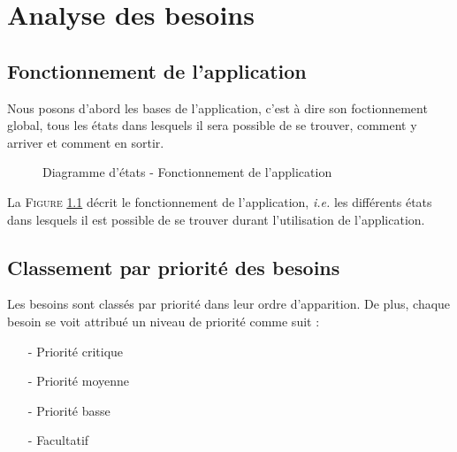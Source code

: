 \chapter{Analyse des besoins}

\section{Fonctionnement de l'application}

Nous posons d'abord les bases de l'application, c'est à dire son foctionnement global, tous les états dans lesquels il sera possible de se trouver, comment y arriver et comment en sortir.

 \begin{figure}[!ht]
 \begin{center}
  \caption{Diagramme d'états - Fonctionnement de l'application}
  \label{etattrans}
 \end{center}
 \end{figure}


 La \textsc{Figure} \ref{etattrans} décrit le fonctionnement de l'application, \textit{i.e.} les différents états dans lesquels il est possible de se trouver durant l'utilisation de l'application.


\section{Classement par priorité des besoins}\label{priorite}

Les besoins sont classés par priorité dans leur ordre d'apparition. De plus, chaque besoin se voit attribué un niveau de priorité comme suit :

\begin{itemize}
 \item[-] Priorité critique
 \item[-] Priorité moyenne
 \item[-] Priorité basse
 \item[-] Facultatif
\end{itemize}

